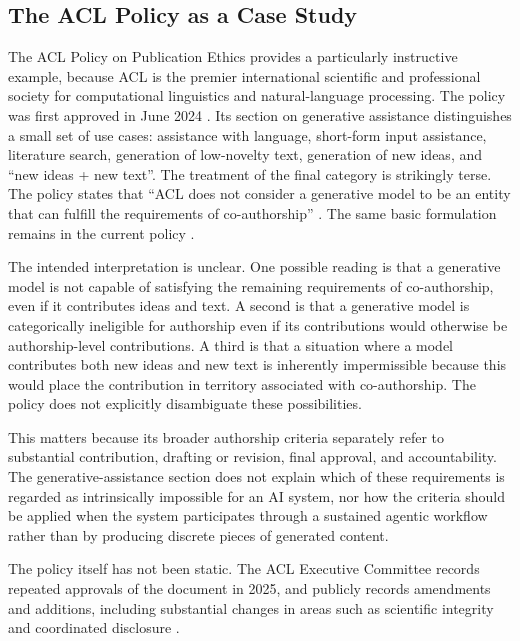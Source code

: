 \documentclass[12pt]{article}
\begin{document}
\subsection{The ACL Policy as a Case Study}

The ACL Policy on Publication Ethics provides a particularly instructive example, because ACL is the premier international scientific and professional society for computational linguistics and natural-language processing.
The policy was first approved in June 2024 \citep{acl2024policy}. Its section on generative assistance distinguishes a small set of use cases: assistance with language, short-form input assistance, literature search, generation of low-novelty text, generation of new ideas, and ``new ideas + new text''.
The treatment of the final category is strikingly terse. The policy states that ``ACL does not consider a generative model to be an entity that can fulfill the requirements of co-authorship'' \citep{acl2024policy}. The same basic formulation remains in the current policy \citep{acl2026policy}.

The intended interpretation is unclear.
One possible reading is that a generative model is not capable of satisfying the remaining requirements of co-authorship, even if it contributes ideas and text. A second is that a generative model is categorically ineligible for authorship even if its contributions would otherwise be authorship-level contributions. A third is that a situation where a model contributes both new ideas and new text is inherently impermissible because this would place the contribution in territory associated with co-authorship.
The policy does not explicitly disambiguate these possibilities.

This matters because its broader authorship criteria separately refer to substantial contribution, drafting or revision, final approval, and accountability. The generative-assistance section does not explain which of these requirements is regarded as intrinsically impossible for an AI system, nor how the criteria should be applied when the system participates through a sustained agentic workflow rather than by producing discrete pieces of generated content.

The policy itself has not been static. The ACL Executive Committee records repeated approvals of the document in 2025, and publicly records amendments and additions, including substantial changes in areas such as scientific integrity and coordinated disclosure \citep{acl2026policy,aclresolutions2025}.
\end{document}
